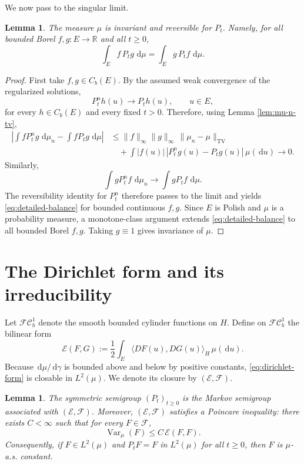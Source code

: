 \documentclass[11pt]{article}
\numberwithin{equation}{section}
\newtheorem{lemma}[theorem]{Lemma}
\newcommand{\dd}{\,\mathrm d}
\newcommand{\1}{\mathbf 1}
\newcommand{\R}{\mathbb R}
\newcommand{\cE}{\mathcal E}
\newcommand{\cF}{\mathcal F}
\newcommand{\Var}{\operatorname{Var}}
\begin{document}
We now pass to the singular limit.

\begin{lemma}\label{lem:limit-reversible}
The measure $\mu$ is invariant and reversible for $P_t$. Namely, for all bounded
Borel $f,g:E\to\R$ and all $t\geq0$,
\begin{equation}\label{eq:detailed-balance}
        \int_E f\,P_tg\,\dd\mu
        =
        \int_E g\,P_tf\,\dd\mu .
\end{equation}
\end{lemma}

\begin{proof}
First take $f,g\in C_b(E)$. By the assumed weak convergence of the regularized
solutions,
\[
        P_t^n h(u)\longrightarrow P_t h(u),\qquad u\in E,
\]
for every $h\in C_b(E)$ and every fixed $t>0$. Therefore, using Lemma
\ref{lem:mu-n-tv},
\[
\begin{aligned}
\left|\int fP_t^ng\,\dd\mu_n-\int fP_tg\,\dd\mu\right|
&\leq
\|f\|_\infty\|g\|_\infty\,\|\mu_n-\mu\|_{\mathrm{TV}}        \\
&\quad
+\int |f(u)|\,|P_t^ng(u)-P_tg(u)|\,\mu(\dd u)
\longrightarrow0.
\end{aligned}
\]
Similarly,
\[
        \int gP_t^nf\,\dd\mu_n\longrightarrow \int gP_tf\,\dd\mu .
\]
The reversibility identity for $P_t^n$ therefore passes to the limit and yields
\eqref{eq:detailed-balance} for bounded continuous $f,g$. Since $E$ is Polish and
$\mu$ is a probability measure, a monotone-class argument extends
\eqref{eq:detailed-balance} to all bounded Borel $f,g$. Taking $g\equiv1$ gives
invariance of $\mu$.
\end{proof}

\section{The Dirichlet form and its irreducibility}

Let $\mathcal{FC}_b^1$ denote the smooth bounded cylinder functions on $H$. Define
on $\mathcal{FC}_b^1$ the bilinear form
\begin{equation}\label{eq:dirichlet-form}
        \cE(F,G)
        :=
        \frac12\int_E \langle DF(u),DG(u)\rangle_H\,\mu(\dd u).
\end{equation}
Because $\dd\mu/\dd\gamma$ is bounded above and below by positive constants,
\eqref{eq:dirichlet-form} is closable in $L^2(\mu)$. We denote its closure by
$(\cE,\cF)$.

\begin{lemma}\label{lem:dirichlet-form}
The symmetric semigroup $(P_t)_{t\geq0}$ is the Markov semigroup associated with
$(\cE,\cF)$. Moreover, $(\cE,\cF)$ satisfies a Poincare inequality: there exists
$C<\infty$ such that for every $F\in\cF$,
\begin{equation}\label{eq:poincare}
        \Var_\mu(F)\leq C\,\cE(F,F).
\end{equation}
Consequently, if $F\in L^2(\mu)$ and $P_tF=F$ in $L^2(\mu)$ for all $t\geq0$, then
$F$ is $\mu$-a.s. constant.
\end{lemma}
\end{document}
